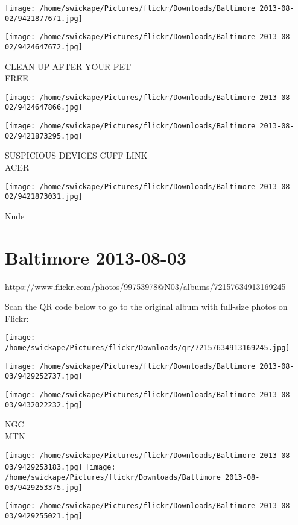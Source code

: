 \documentclass[10pt,letterpaper]{article}
\begin{document}
\texttt{[image: /home/swickape/Pictures/flickr/Downloads/Baltimore 2013-08-02/9421877671.jpg]}

\vspace{0.25in}
\texttt{[image: /home/swickape/Pictures/flickr/Downloads/Baltimore 2013-08-02/9424647672.jpg]}

CLEAN UP AFTER YOUR PET\\
FREE
\pagebreak

\texttt{[image: /home/swickape/Pictures/flickr/Downloads/Baltimore 2013-08-02/9424647866.jpg]}

\vspace{0.25in}
\texttt{[image: /home/swickape/Pictures/flickr/Downloads/Baltimore 2013-08-02/9421873295.jpg]}

SUSPICIOUS DEVICES CUFF LINK\\
ACER
\pagebreak

\texttt{[image: /home/swickape/Pictures/flickr/Downloads/Baltimore 2013-08-02/9421873031.jpg]}

Nude
\pagebreak

\section*{Baltimore 2013-08-03}

\url{https://www.flickr.com/photos/99753978@N03/albums/72157634913169245}

Scan the QR code below to go to the original album with full-size photos on Flickr:

\texttt{[image: /home/swickape/Pictures/flickr/Downloads/qr/72157634913169245.jpg]}
\pagebreak

\texttt{[image: /home/swickape/Pictures/flickr/Downloads/Baltimore 2013-08-03/9429252737.jpg]}

\vspace{0.25in}
\texttt{[image: /home/swickape/Pictures/flickr/Downloads/Baltimore 2013-08-03/9432022232.jpg]}

NGC\\
MTN
\pagebreak

\texttt{[image: /home/swickape/Pictures/flickr/Downloads/Baltimore 2013-08-03/9429253183.jpg]}
\texttt{[image: /home/swickape/Pictures/flickr/Downloads/Baltimore 2013-08-03/9429253375.jpg]}

\vspace{0.25in}
\texttt{[image: /home/swickape/Pictures/flickr/Downloads/Baltimore 2013-08-03/9429255021.jpg]}
\end{document}
